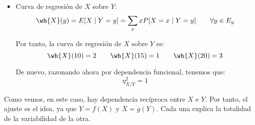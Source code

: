 \begin{ejercicio}
\begin{enumerate}
\begin{itemize}

            \item Curva de regresión de $X$ sobre $Y$:
            \begin{equation*}
                \wh{X}(y) = E[X\mid Y = y] = \sum_{x} x P[X = x\mid Y = y] \qquad \forall y\in E_y
            \end{equation*}

            Por tanto, la curva de regresión de $X$ sobre $Y$ es:
            \begin{equation*}
                \wh{X}(10) = 2 \qquad \wh{X}(15) = 1 \qquad \wh{X}(20) = 3
            \end{equation*}

            De nuevo, razonando ahora por dependencia funcional, tenemos que:
            \begin{equation*}
                \eta^2_{X/Y} = 1
            \end{equation*}
        \end{itemize}

        Como vemos, en este caso, hay dependencia recíproca entre $X$ e $Y$. Por tanto,
        el ajuste es el idea, ya que $Y=f(X)$ y $X=g(Y)$.
        Cada una explica la totalidad de la variabilidad de la otra.



\end{enumerate}
\end{ejercicio}
